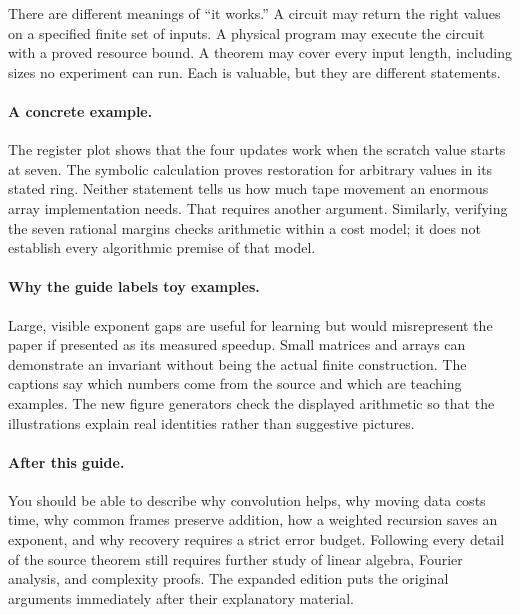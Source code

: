 
There are different meanings of ``it works.'' A circuit may return the
right values on a specified finite set of inputs. A physical program may
execute the circuit with a proved resource bound. A theorem may cover every
input length, including sizes no experiment can run. Each is valuable, but
they are different statements.


\paragraph{A concrete example.}
The register plot shows that the four updates work when the scratch value
starts at seven. The symbolic calculation proves restoration for arbitrary
values in its stated ring. Neither statement tells us how much tape
movement an enormous array implementation needs. That requires another
argument. Similarly, verifying the seven rational margins checks arithmetic
within a cost model; it does not establish every algorithmic premise of that
model.

\paragraph{Why the guide labels toy examples.}
Large, visible exponent gaps are useful for learning but would misrepresent
the paper if presented as its measured speedup. Small matrices and arrays
can demonstrate an invariant without being the actual finite construction.
The captions say which numbers come from the source and which are teaching
examples. The new figure generators check the displayed arithmetic so that
the illustrations explain real identities rather than suggestive pictures.

\paragraph{After this guide.}
You should be able to describe why convolution helps, why moving data costs
time, why common frames preserve addition, how a weighted recursion saves
an exponent, and why recovery requires a strict error budget. Following
every detail of the source theorem still requires further study of linear
algebra, Fourier analysis, and complexity proofs. The expanded edition puts
the original arguments immediately after their explanatory material.

